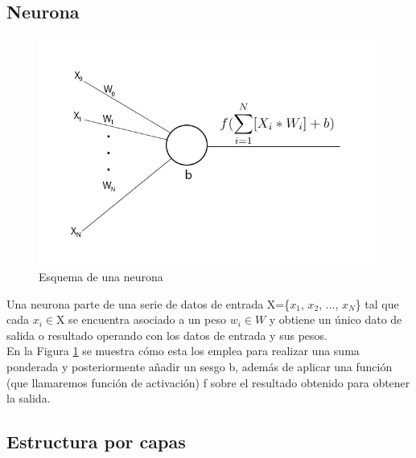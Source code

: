 \subsection{Neurona}

\begin{figure}[H]
	\centering
	\includegraphics[scale=0.35]{imagenes/neurona.jpg}  
	\caption{Esquema de una neurona}
	\label{fig:neurona}
\end{figure}

Una neurona parte de una serie de datos de entrada X=\{$x_1$, $x_2$, ..., $x_N$\} tal que cada $x_i$$\in${X} se encuentra asociado a un peso $w_i\in{W}$ y obtiene un único dato de salida o resultado operando con los datos de entrada y sus pesos. \\
En la Figura \ref{fig:neurona} se muestra cómo esta los emplea para realizar una suma ponderada y posteriormente añadir un sesgo b, además de aplicar una función (que llamaremos función de activación) f sobre el resultado obtenido para obtener la salida. 

\subsection{Estructura por capas}

